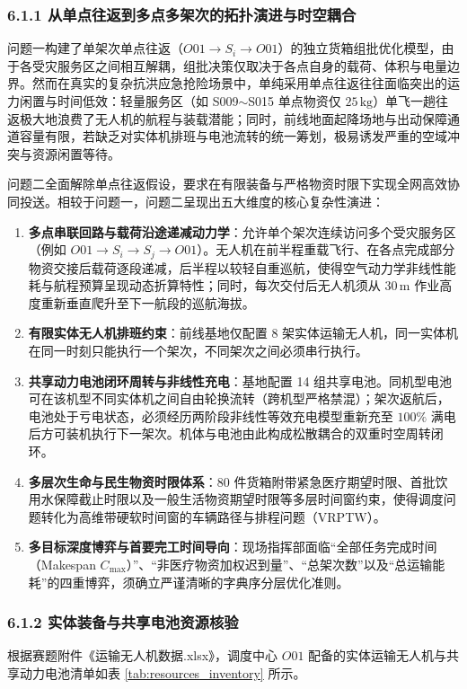 \documentclass[withoutpreface,bwprint]{format}
\begin{document}
\subsubsection{6.1.1 从单点往返到多点多架次的拓扑演进与时空耦合}
问题一构建了单架次单点往返（$O01 \to S_i \to O01$）的独立货箱组批优化模型，由于各受灾服务区之间相互解耦，组批决策仅取决于各点自身的载荷、体积与电量边界。然而在真实的复杂抗洪应急抢险场景中，单纯采用单点往返往往面临突出的运力闲置与时间低效：轻量服务区（如 S009$\sim$S015 单点物资仅 $25\,\text{kg}$）单飞一趟往返极大地浪费了无人机的航程与装载潜能；同时，前线地面起降场地与出动保障通道容量有限，若缺乏对实体机排班与电池流转的统一筹划，极易诱发严重的空域冲突与资源闲置等待\cite{poikonen2017, schermer2019}。

问题二全面解除单点往返假设，要求在有限装备与严格物资时限下实现全网高效协同投送。相较于问题一，问题二呈现出五大维度的核心复杂性演进：
\begin{enumerate}[leftmargin=*]
    \item \textbf{多点串联回路与载荷沿途递减动力学}：允许单个架次连续访问多个受灾服务区（例如 $O01 \to S_i \to S_j \to O01$）。无人机在前半程重载飞行、在各点完成部分物资交接后载荷逐段递减，后半程以较轻自重巡航，使得空气动力学非线性能耗与航程预算呈现动态折算特性；同时，每次交付后无人机须从 $30\,\text{m}$ 作业高度重新垂直爬升至下一航段的巡航海拔。
    \item \textbf{有限实体无人机排班约束}：前线基地仅配置 8 架实体运输无人机，同一实体机在同一时刻只能执行一个架次，不同架次之间必须串行执行。
    \item \textbf{共享动力电池闭环周转与非线性充电}：基地配置 14 组共享电池。同机型电池可在该机型不同实体机之间自由轮换流转（跨机型严格禁混）；架次返航后，电池处于亏电状态，必须经历两阶段非线性等效充电模型重新充至 $100\%$ 满电后方可装机执行下一架次。机体与电池由此构成松散耦合的双重时空周转闭环。
    \item \textbf{多层次生命与民生物资时限体系}：80 件货箱附带紧急医疗期望时限、首批饮用水保障截止时限以及一般生活物资期望时限等多层时间窗约束，使得调度问题转化为高维带硬软时间窗的车辆路径与排程问题（VRPTW）。
    \item \textbf{多目标深度博弈与首要完工时间导向}：现场指挥部面临“全部任务完成时间（Makespan $C_{\max}$）”、“非医疗物资加权迟到量”、“总架次数”以及“总运输能耗”的四重博弈，须确立严谨清晰的字典序分层优化准则。
\end{enumerate}

\subsubsection{6.1.2 实体装备与共享电池资源核验}
根据赛题附件《运输无人机数据.xlsx》，调度中心 $O01$ 配备的实体运输无人机与共享动力电池清单如表 \ref{tab:resources_inventory} 所示。
\end{document}
